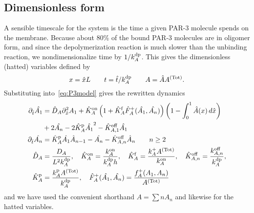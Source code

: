 \documentclass[11pt]{article}
\newcommand{\6}[1]{#1_{\text{6}}}
\newcommand{\3}[1]{#1_{\text{3}}}
\newcommand{\Tot}[1]{#1^\text{(Tot)}}
\newcommand{\A}[1]{#1_A}
\begin{document}
\subsection{Dimensionless form}
A sensible timescale for the system is the time a given PAR-3 molecule spends on the membrane. Because about 80\% of the bound PAR-3 molecules are in oligomer form, and since the depolymerization reaction is much slower than the unbinding reaction, we nondimensionalize time by $1/\A{\kdp}$. This gives the dimensionless (hatted) variables defined by
\begin{equation*}
x = \hat{x} L \qquad t= \hat{t}/\A{\kdp} \qquad A= \hat{A}\Tot{A}.
\end{equation*}
Substituting into\ \eqref{eq:P3model} gives the rewritten dynamics
\begin{subequations}
\label{eq:PAR3gen}
\begin{align}
\nonumber
\Dthat \hat{\MA} & = \DhatA \Dxhat^2 \MA +\KhatonA \left(1+\KhatfA \hat F_A^+(\hat \MA, \hat \PA) \right)\left(1 - \int_0^1 \hat A(x) \, d\hat{x} \right) \\ 
\label{eq:Amono} &+ 2 \hat{\PA}-2\KhatpA \hat{\MA}^2 - \Khatoff_{A,1} \hat{\MA} \\
\label{eq:Apoly}
\Dthat \hat{\PA} & =\KhatpA \hat{\MA} \hat A_{n-1} - \hat{\PA}-\Khatoff_{A,n}\hat A_n \qquad n \geq 2 \\ 
\label{eq:paramsND}
\DhatA &=\frac{\A{D}}{L^2 \A{\kdp}}, \quad \KhatonA=\frac{\A{\kon}}{\A{\kdp} h }, \quad \KhatfA = \frac{\A{\kf}\Tot{A}}{\A{\kon}}, \quad  \Khatoff_{A,n} = \frac{\koff_{A,n}}{\A{\kdp}}, \\ \nonumber \KhatpA &= \frac{\A{\kp} \Tot{A}}{\A{\kdp}},\quad \hat F_A^+(\hat \MA,\hat \PA) =\frac{\A{f}^+(\MA,\PA)}{\Tot{A}}
\end{align}
\end{subequations}
and we have used the convenient shorthand $A=\sum n A_n$ and likewise for the hatted variables.
\end{document}
